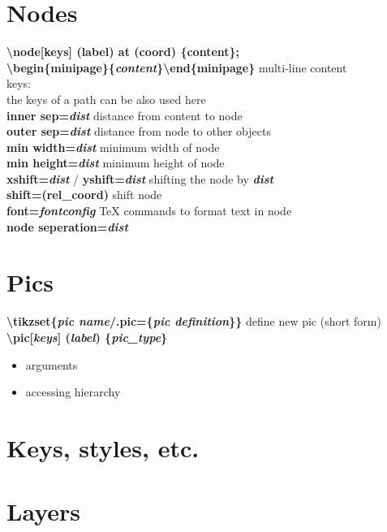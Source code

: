 \documentclass[10pt]{article}
\newcommand{\tikzcmd}[1]{\textbf{#1}}
\newcommand{\tikzparam}[1]{\textbf{\emph{#1}}}
\begin{document}
\begin{multicols}{2}
        \section{Nodes}
        \tikzcmd{\textbackslash node[keys] (label) at (coord) \{content\};}\\
        \tikzcmd{\textbackslash begin\{minipage\}\{\tikzparam{content}\}\textbackslash end\{minipage\} } multi-line content\\
        keys:\\
        the keys of a path can be also used here\\
        \tikzcmd{inner sep=\tikzparam{dist}} distance from content to node\\
        \tikzcmd{outer sep=\tikzparam{dist}} distance from node to other objects\\
        \tikzcmd{min width=\tikzparam{dist}} minimum width of node\\
        \tikzcmd{min height=\tikzparam{dist}} minimum height of node\\
        \tikzcmd{xshift=\tikzparam{dist}} / \tikzcmd{yshift=\tikzparam{dist}} shifting the node by \tikzparam{dist}\\
        \tikzcmd{shift=(rel\_coord)} shift node\\
        \tikzcmd{font=\tikzparam{fontconfig}} TeX commands to format text in node\\
        \tikzcmd{node seperation=\tikzparam{dist}}

        \section{Pics}
        \tikzcmd{\textbackslash tikzset\{\tikzparam{pic name}/.pic=\{\tikzparam{pic definition}\}\}} define new pic (short form)\\
        \tikzcmd{\textbackslash pic[\tikzparam{keys}] (\tikzparam{label}) \{\tikzparam{pic\_type}\} }
        \begin{itemize}

            \item arguments
            \item accessing hierarchy
        \end{itemize}

        \section{Keys, styles, etc.}

        \section{Layers}

    \end{multicols}
\end{document}
